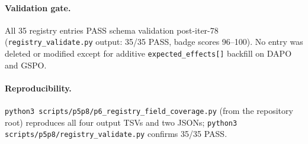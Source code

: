 \paragraph{Validation gate.}
All 35 registry entries PASS schema validation post-iter-78
(\texttt{registry\_validate.py} output: 35/35 PASS, badge scores
96--100). No entry was deleted or modified except for additive
\texttt{expected\_effects[]} backfill on DAPO and GSPO.

\paragraph{Reproducibility.}
\texttt{python3 scripts/p5p8/p6\_registry\_field\_coverage.py} (from the
repository root) reproduces all four
output TSVs and two JSONs; \texttt{python3 scripts/p5p8/registry\_validate.py}
confirms 35/35 PASS.